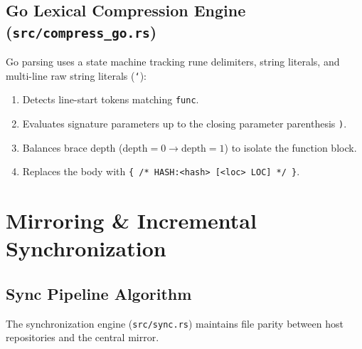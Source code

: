 \documentclass[11pt,a4paper]{article}
\begin{document}
\subsection{Go Lexical Compression Engine (\texorpdfstring{\texttt{src/compress\_go.rs}}{src/compress\_go.rs})}
Go parsing uses a state machine tracking rune delimiters, string literals, and multi-line raw string literals (\texttt{\string`}):
\begin{enumerate}
    \item Detects line-start tokens matching \texttt{func}.
    \item Evaluates signature parameters up to the closing parameter parenthesis \texttt{)}.
    \item Balances brace depth ($\text{depth} = 0 \to \text{depth} = 1$) to isolate the function block.
    \item Replaces the body with \texttt{\{ /* HASH:<hash> [<loc> LOC] */ \}}.
\end{enumerate}

\section{Mirroring \& Incremental Synchronization}

\subsection{Sync Pipeline Algorithm}
The synchronization engine (\texttt{src/sync.rs}) maintains file parity between host repositories and the central mirror.
\end{document}
